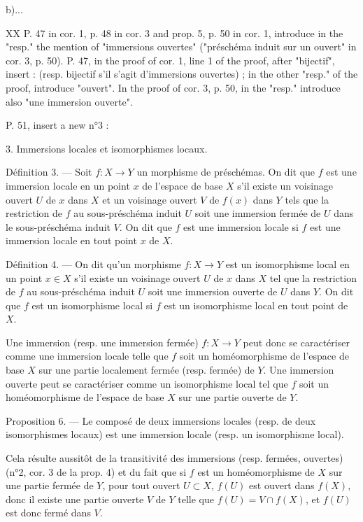 b)...

XX P. 47 in cor. 1, p. 48 in cor. 3 and prop. 5, p. 50 in cor. 1, introduce in the "resp." the mention of "immersions ouvertes" ("préschéma induit sur un ouvert" in cor. 3, p. 50). P. 47, in the proof of cor. 1, line 1 of the proof, after "bijectif", insert : (resp. bijectif s'il s'agit d'immersions ouvertes) ; in the other "resp." of the proof, introduce "ouvert". In the proof of cor. 3, p. 50, in the "resp." introduce also "une immersion ouverte".

P. 51, insert a new n°3 :

\newpage


3. Immersions locales et isomorphismes locaux.

Définition 3. — Soit $f: X \to Y$ un morphisme de préschémas. On dit que $f$ est une immersion locale en un point $x$ de l'espace de base $X$ s'il existe un voisinage ouvert $U$ de $x$ dans $X$ et un voisinage ouvert $V$ de $f(x)$ dans $Y$ tels que la restriction de $f$ au sous-préschéma induit $U$ soit une immersion fermée de $U$ dans le sous-préschéma induit $V$. On dit que $f$ est une immersion locale si $f$ est une immersion locale en tout point $x$ de $X$.

Définition 4. — On dit qu'un morphisme $f: X \to Y$ est un isomorphisme local en un point $x \in X$ s'il existe un voisinage ouvert $U$ de $x$ dans $X$ tel que la restriction de $f$ au sous-préschéma induit $U$ soit une immersion ouverte de $U$ dans $Y$. On dit que $f$ est un isomorphisme local si $f$ est un isomorphisme local en tout point de $X$.

Une immersion (resp. une immersion fermée) $f: X \to Y$ peut donc se caractériser comme une immersion locale telle que $f$ soit un homéomorphisme de l'espace de base $X$ sur une partie localement fermée (resp. fermée) de $Y$. Une immersion ouverte peut se caractériser comme un isomorphisme local tel que $f$ soit un homéomorphisme de l'espace de base $X$ sur une partie ouverte de $Y$.

Proposition 6. — Le composé de deux immersions locales (resp. de deux isomorphismes locaux) est une immersion locale (resp. un isomorphisme local).

Cela résulte aussitôt de la transitivité des immersions (resp. fermées, ouvertes) (n°2, cor. 3 de la prop. 4) et du fait que si $f$ est un homéomorphisme de $X$ sur une partie fermée de $Y$, pour tout ouvert $U \subset X$, $f(U)$ est ouvert dans $f(X)$, donc il existe une partie ouverte $V$ de $Y$ telle que $f(U) = V \cap f(X)$, et $f(U)$ est donc fermé dans $V$.

